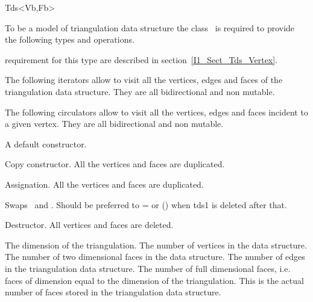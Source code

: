 \begin{ccClassTemplate}{Tds<Vb,Fb>}

To be a model of  triangulation data structure 
the class \ccClassTemplateName\
is required to  provide the
following types and operations.

\ccGlue
{}
\ccThreeToTwo
{}
\ccGlue
{}
\ccGlue
{} { requirement for this type are described in  section~\ref{I1_Sect_Tds_Vertex}.}
\ccGlue
{}

The following iterators allow to visit all the vertices, edges and faces
of the triangulation data structure. They are all bidirectional and non mutable.

\ccGlue
{}
\ccGlue
{}

The following circulators allow to visit all the vertices, edges and faces
incident to a given vertex. They are all bidirectional and non mutable.

\ccGlue
{}
\ccGlue
{}
  
\ccCreation
{}
{A default constructor.}

{Copy constructor. All the vertices and faces are duplicated.}

{Assignation. All the vertices and faces are duplicated.}

{Swaps \ccVar\ and . Should be preferred to \ccVar= or \ccVar()
when tds1 is deleted after that.}

{Destructor. All vertices and faces are deleted.}

\ccAccessFunctions
{}
{The dimension of the triangulation.}
\ccGlue
{}
{The number of vertices in the data structure.}
\ccGlue
{}
{The number of two dimensional faces in the data structure.}
\ccGlue
{}
{The number of edges  in the triangulation data structure.}
\ccGlue
{}
{The number of full dimensional faces, 
i.e. faces of dimension equal to the dimension
of the triangulation. This is the actual
number of faces stored in the triangulation data structure.}


\end{ccClassTemplate}
